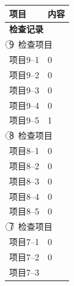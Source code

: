 \documentclass[UTF8,10pt,a4paper,fontset=fandol]{ctexart}
\newcommand{\fieldvalue}[1]{#1}
\newcommand{\handwritten}[1]{#1}
\begin{document}
\begin{tabularx}{\textwidth}{|p{}|X|}
\hline
\textbf{项目} & \textbf{内容} \\
\hline
\multicolumn{2}{|l|}{\textbf{检查记录}} \\
\hline
\multicolumn{2}{|l|}{\textcircled{9}\ 检查项目} \\
\hline
项目9--1 &
\fieldvalue{\handwritten{0}} \\
\hline
项目9--2 &
\fieldvalue{\handwritten{0}} \\
\hline
项目9--3 &
\fieldvalue{\handwritten{0}} \\
\hline
项目9--4 &
\fieldvalue{\handwritten{0}} \\
\hline
项目9--5 &
\fieldvalue{\handwritten{1}} \\
\hline
\multicolumn{2}{|l|}{\textcircled{8}\ 检查项目} \\
\hline
项目8--1 &
\fieldvalue{\handwritten{0}} \\
\hline
项目8--2 &
\fieldvalue{\handwritten{0}} \\
\hline
项目8--3 &
\fieldvalue{\handwritten{0}} \\
\hline
项目8--4 &
\fieldvalue{\handwritten{0}} \\
\hline
项目8--5 &
\fieldvalue{\handwritten{0}} \\
\hline
\multicolumn{2}{|l|}{\textcircled{7}\ 检查项目} \\
\hline
项目7--1 &
\fieldvalue{\handwritten{0}} \\
\hline
项目7--2 &
\fieldvalue{\handwritten{0}} \\
\hline
项目7--3 &

\end{tabularx}
\end{document}
